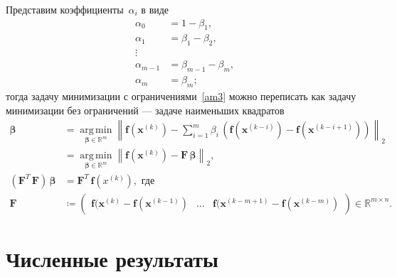 \documentclass[a4paper, 14pt]{extarticle}
\DeclareMathOperator{\argmin}{arg\,min}
\newcommand{\vect}[1]{\boldsymbol{\mathbf{#1}}}
\begin{document}
	Представим коэффициенты~$\alpha_i$ в виде
	\begin{align*}
		\alpha_0		&= 1 - \beta_1, \\
		\alpha_1		&= \beta_1 - \beta_2, \\
		\vdots			& \\
		\alpha_{m-1}	&= \beta_{m-1} - \beta_m, \\
		\alpha_m		&= \beta_m;
	\end{align*}
	тогда задачу минимизации с ограничениями~\eqref{am3} можно переписать как задачу минимизации без ограничений --- задаче наименьших квадратов
	\begin{equation}\label{lsq}
		\begin{aligned}
			\vect\beta 
				&= \underset{\vect\beta \in \mathbb R^m}{\argmin} \left\lVert \vect f(\vect x^{(k)}) - \sum_{i=1}^{m} \beta_i\,(\vect f(\vect x^{(k-i)}) - \vect f(\vect x^{(k-i+1)})) \right\lVert_2 \\
				&= \underset{\vect\beta \in \mathbb R^m}{\argmin} \left\lVert \vect f(\vect x^{(k)}) - \vect F\,\vect\beta \right\lVert_2, \\
			\left(\vect F^T\,\vect F\right)\,\vect\beta 
				&= \vect F^T\,\vect f(x^{(k)}), \text{ где} \\ 
			\vect F 
				&\coloneqq \begin{pmatrix}
					\vect f(\vect x^{(k)} - \vect f(\vect x^{(k-1)}) & \dots & \vect f(\vect x^{(k-m+1)} - \vect f(\vect x^{(k-m)})
				\end{pmatrix} \in \mathbb R^{m \times n}.
		\end{aligned}
	\end{equation}
	
	\section{Численные результаты}
	
\end{document}
